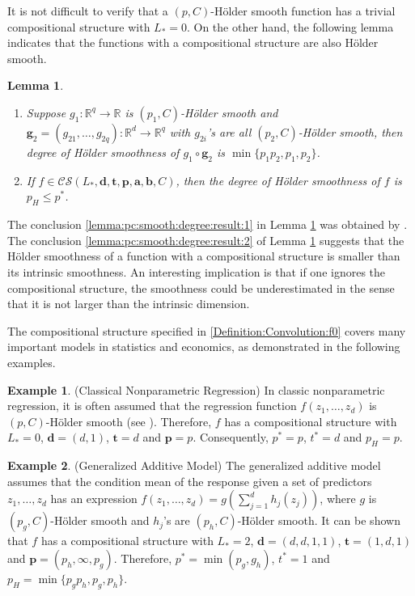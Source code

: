 \documentclass[11pt, preprint]{imsart}
\numberwithin{equation}{section}
\def \mcCS{\mathcal{C}\mathcal{S}}
\def \bfg{\mathbf{g}}
\def \bfd{\mathbf{d}}
\def \bft{\mathbf{t}}
\def \bfp{\mathbf{p}}
\def \bfa{\mathbf{a}}
\def \bfb{\mathbf{b}}
\def \bfa{\mathbf{a}}
\def \bfb{\mathbf{b}}
\def \bft{\mathbf{t}}
\theoremstyle{plain}
\newtheorem{lemma}{\indent Lemma}
\theoremstyle{definition}
\newtheorem{Example}{Example}
\begin{document}
It is not difficult to verify that a $(p, C)$-H\" older smooth function has a trivial compositional structure with $L_*=0$. On the other hand, the following lemma indicates that the functions with a compositional structure are also H\" older smooth.
\begin{lemma}\label{lemma:pc:smooth:degree}
\begin{enumerate}[label={(\roman*}),ref={(\roman*})]
\item \label{lemma:pc:smooth:degree:result:1} Suppose $g_1: \mathbb{R}^{q} \to \mathbb{R}$ is $(p_1, C)$-H\" older smooth and $\bfg_2=(g_{21},\ldots, g_{2q}): \mathbb{R}^{d} \to \mathbb{R}^q$ with  $g_{2i}$'s are all $(p_2, C)$-H\" older smooth, then degree of H\" older smoothness of $g_1\circ \bfg_2$ is $\min\{p_1p_2, p_1, p_2\}$.
\item  \label{lemma:pc:smooth:degree:result:2}  If $f\in \mcCS(L_*, \bfd, \bft, \bfp,\bfa, \bfb, C)$, then the degree of H\" older smoothness of $f$ is $p_H\leq p^*$. 
\end{enumerate}
\end{lemma}
The conclusion \ref{lemma:pc:smooth:degree:result:1} in Lemma \ref{lemma:pc:smooth:degree} was obtained by \cite{jlt09}. The conclusion \ref{lemma:pc:smooth:degree:result:2} of Lemma \ref{lemma:pc:smooth:degree} suggests that the  H\" older smoothness of a function with a compositional structure is smaller than its intrinsic smoothness. {An interesting implication is that if one ignores the compositional structure, the smoothness could be underestimated in the sense that it is not larger than the intrinsic dimension.}

The compositional structure specified in  \ref{Definition:Convolution:f0} covers many important models in statistics and economics, as demonstrated in the following examples. 
\begin{Example}\label{example:4} (Classical Nonparametric Regression) In classic nonparametric regression,
it is often assumed that the regression function $f(z_1,\ldots, z_d)$ is $(p, C)$-H\" older smooth
(see \citealp{h98, h03, c07}). Therefore, $f$ has a compositional structure with $L_*=0$, $\bfd=(d,1)$, $\bft=d$ and $\bfp=p$. Consequently, $p^*=p$, $t^*=d$ and $p_H=p$.
\end{Example}

\begin{Example}\label{example:2} (Generalized Additive Model) The generalized additive model assumes that the condition mean 
of the response given a set of predictors $z_1,\ldots,z_d$ has an expression $f(z_1, \ldots, z_d)=g(\sum_{j=1}^dh_j(z_j))$, where $g$ is $(p_g, C)$-H\" older smooth and $h_j$'s are $(p_h, C)$-H\" older smooth. It can be shown that $f$ has a compositional structure with $L_*=2$, $\bfd=(d, d, 1, 1)$, $\bft=(1, d, 1)$ and $\bfp=(p_h, \infty, p_g)$. Therefore,  $p^*=\min(p_g, g_h)$,  $t^*=1$ and $p_H=\min\{p_gp_h, p_g, p_h\}$.
\end{Example}
\end{document}
